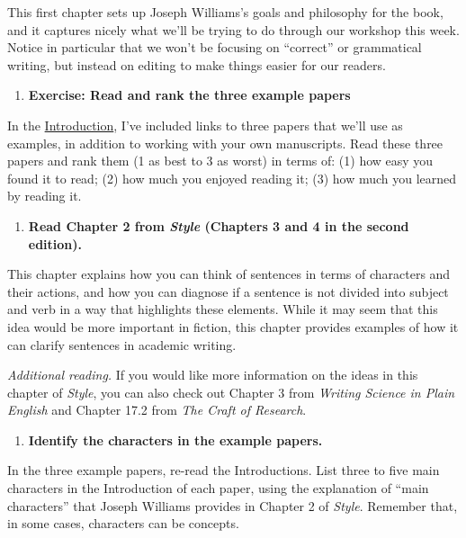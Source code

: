 \documentclass[]{tufte-book}
\providecommand{\tightlist}{%
  \setlength{\itemsep}{0pt}\setlength{\parskip}{0pt}}
\begin{document}
This first chapter sets up Joseph Williams's goals and philosophy for the book,
and it captures nicely what we'll be trying to do through our workshop this
week. Notice in particular that we won't be focusing on ``correct'' or grammatical
writing, but instead on editing to make things easier for our readers.

\begin{enumerate}
\def\labelenumi{\arabic{enumi}.}
\setcounter{enumi}{1}
\tightlist
\item
  \textbf{Exercise: Read and rank the three example papers}
\end{enumerate}

In the
\href{https://geanders.github.io/writing_workshop/1-1-readings-for-the-workshop.html\#readings-for-the-workshop}{Introduction},
I've included links to three papers that we'll use as examples, in addition to
working with your own manuscripts. Read these three papers and rank them (1 as
best to 3 as worst) in terms of: (1) how easy you found it to read; (2) how much
you enjoyed reading it; (3) how much you learned by reading it.

\begin{enumerate}
\def\labelenumi{\arabic{enumi}.}
\setcounter{enumi}{2}
\tightlist
\item
  \textbf{Read Chapter 2 from \emph{Style} (Chapters 3 and 4 in the second edition).}
\end{enumerate}

This chapter explains how you can think of sentences in terms of characters and
their actions, and how you can diagnose if a sentence is not divided into
subject and verb in a way that highlights these elements. While it may seem that
this idea would be more important in fiction, this chapter provides examples of how
it can clarify sentences in academic writing.

\emph{Additional reading.} If you would like more information on the ideas in this
chapter of \emph{Style}, you can also check out Chapter 3 from \emph{Writing Science in Plain English}
and Chapter 17.2 from \emph{The Craft of Research}.

\begin{enumerate}
\def\labelenumi{\arabic{enumi}.}
\setcounter{enumi}{3}
\tightlist
\item
  \textbf{Identify the characters in the example papers.}
\end{enumerate}

In the three example papers, re-read the Introductions. List three to five main
characters in the Introduction of each paper, using the explanation of ``main characters''
that Joseph Williams provides in Chapter 2 of \emph{Style}. Remember that, in some cases,
characters can be concepts.
\end{document}
